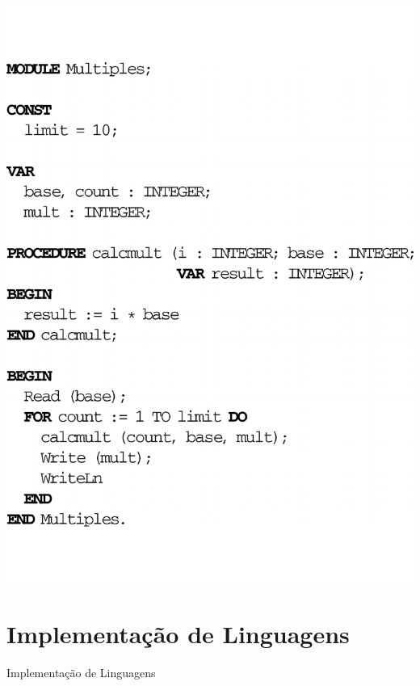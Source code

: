 \documentclass{beamer}
\begin{document}
\begin{frame}
    \includegraphics[scale=0.27]{imagens/code.pdf}
\end{frame} 

\section{Implementa\c c\~{a}o de Linguagens}

\begin{frame}
  \begin{center}
\huge{Implementa\c c\~{a}o de Linguagens \\ \pause  \faQuestionCircle}
\end{center}
\end{frame}
\end{document}
